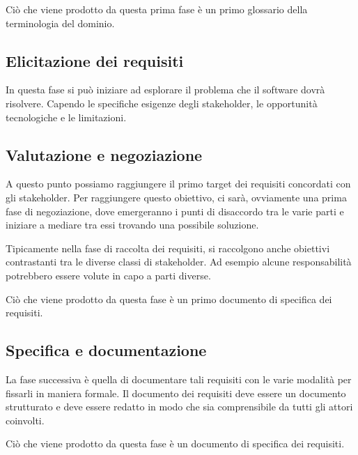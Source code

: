 \begin{tcolorbox}[colback=yellow!5!white,colframe=yellow!75!black]
Ciò che viene prodotto da questa prima fase è un primo glossario della terminologia
del dominio.
\end{tcolorbox}

\subsection{Elicitazione dei requisiti}
In questa fase si può iniziare ad esplorare il problema che il software 
dovrà risolvere. Capendo le specifiche esigenze degli stakeholder, le opportunità 
tecnologiche e le limitazioni. 
\subsection{Valutazione e negoziazione}
A questo punto possiamo raggiungere il primo target 
dei requisiti concordati con gli stakeholder.
Per raggiungere questo obiettivo, ci sarà, ovviamente una prima fase di negoziazione, 
dove emergeranno i punti di disaccordo tra le varie parti e iniziare a mediare 
tra essi trovando una possibile soluzione.

Tipicamente nella fase di raccolta dei requisiti, si raccolgono anche 
obiettivi contrastanti tra le diverse classi di stakeholder.
Ad esempio alcune responsabilità potrebbero essere volute in capo a parti diverse.

\begin{tcolorbox}[colback=red!5!white,colframe=red!75!black]
    Ciò che viene prodotto da questa fase è un primo documento di
    specifica dei requisiti. 
\end{tcolorbox}

\subsection{Specifica e documentazione}
La fase successiva è quella di documentare tali requisiti con le varie modalità 
per fissarli in maniera formale.
Il documento dei requisiti deve essere un documento strutturato e  deve essere 
redatto in modo che sia comprensibile da tutti gli attori coinvolti.

\begin{tcolorbox}[colback=green!5!white,colframe=green!75!black]
    Ciò che viene prodotto da questa fase è un documento di specifica dei requisiti.
\end{tcolorbox}
